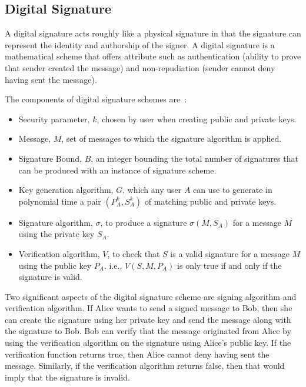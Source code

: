 \subsection{Digital Signature} \label{subsec:digitalsignature}
A digital signature acts roughly like a physical signature in that the
signature can represent the identity and authorship of the signer. A digital
signature is a mathematical scheme that offers attribute such as authentication
(ability to prove that sender created the message) and non-repudiation (sender
cannot deny having sent the message). \par
The components of digital signature schemes are~\cite{rivest1978method}: 
\begin{itemize}
	\item Security parameter, $k$, chosen by user when creating public and
		private keys.
	\item Message, $M$, set of messages to which the signature algorithm is
		applied.
	\item Signature Bound, $B$, an integer bounding the total number of
		signatures that can be produced with an instance of signature scheme.
	\item Key generation algorithm, $G$, which any user $A$ can use to generate
		in polynomial time a pair $(P^{k}_A, S^{k}_A)$ of matching public and
		private keys. 
	\item Signature algorithm, $\sigma$, to produce a signature $\sigma(M,
		S_{A})$ for a message $M$ using the private key $S_{A}$. 
	\item Verification algorithm, $V$, to check that $S$ is a valid signature
		for a message $M$ using the public key $P_{A}$. i.e., $V(S,M,P_A)$ is only
		true if and only if the signature is valid. 
\end{itemize}
Two significant aspects of the digital signature scheme are signing algorithm
and verification algorithm. If Alice wants to send a signed message to Bob,
then she can create the signature using her private key and send the message
along with the signature to Bob. Bob can verify that the message originated
from Alice by using the verification algorithm on the signature using Alice's
public key. If the verification function returns true, then Alice cannot deny
having sent the message. Similarly, if the verification algorithm returns
false, then that would imply that the signature is invalid. \par   

